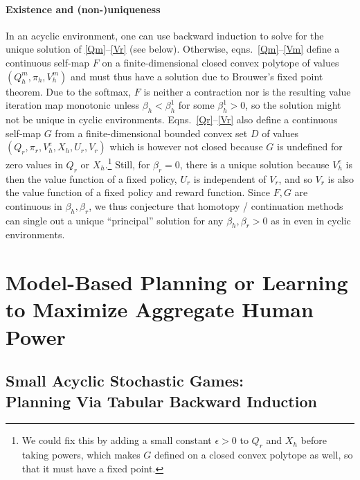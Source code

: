 \documentclass[letterpaper]{article} %
\begin{document}
\paragraph{Existence and (non-)uniqueness}
In an acyclic environment, one can use backward induction to solve for the unique solution of \eqref{Qm}--\eqref{Vr} (see below).
Otherwise, eqns.~\eqref{Qm}--\eqref{Vm} define a continuous self-map $F$ on a finite-dimensional closed convex polytope of values $(Q^m_h,\pi_h,V^m_h)$ and must thus have a solution due to Brouwer's fixed point theorem. 
Due to the softmax, $F$ is neither a contraction nor is the resulting value iteration map monotonic unless $\beta_h<\beta_h^1$ for some $\beta_h^1>0$, so the solution might not be unique in cyclic environments.  
Eqns.~\eqref{Qr}--\eqref{Vr} also define a continuous self-map $G$ from a finite-dimensional bounded convex set $D$ of values $(Q_r,\pi_r,V^e_h,X_h,U_r,V_r)$ which is however not closed because $G$ is undefined for zero values in $Q_r$ or $X_h$.\footnote{%
    We could fix this by adding a small constant $\epsilon>0$ to $Q_r$ and $X_h$ before taking powers, which makes $G$ defined on a closed convex polytope as well, so that it must have a fixed point.
    }
Still, for $\beta_r=0$, there is a unique solution because $V^e_h$ is then the value function of a fixed policy, $U_r$ is independent of $V_r$, and so $V_r$ is also the value function of a fixed policy and reward function.
Since $F,G$ are continuous in $\beta_h,\beta_r$,
we thus conjecture that homotopy / continuation methods can single out a unique ``principal'' solution for any $\beta_h,\beta_r>0$ as in \citet{goeree2016quantal} even in cyclic environments.




\section{Model-Based Planning or Learning\\ to Maximize Aggregate Human Power}



\subsection{Small Acyclic Stochastic Games:\\ Planning Via Tabular Backward Induction}
\end{document}
